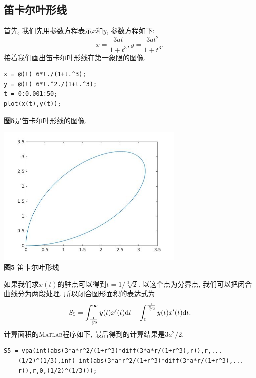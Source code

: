\documentclass[a4paper,12pt]{article}
\begin{document}
\begin{CJK*}{UTF8}{gbsn}
\section{笛卡尔叶形线}
首先, 我们先用参数方程表示$x$和$y$, 参数方程如下:
\begin{equation*}
x=\frac{3at}{1+t^3}, y=\frac{3at^2}{1+t^3}.
\end{equation*}
接着我们画出笛卡尔叶形线在第一象限的图像.\vspace{-15pt}
\begin{lstlisting}
x = @(t) 6*t./(1+t.^3);
y = @(t) 6*t.^2./(1+t.^3);
t = 0:0.001:50;
plot(x(t),y(t));
\end{lstlisting}\par\vspace{10pt}
\textbf{图5}是笛卡尔叶形线的图像.\vspace{-5pt}
\begin{center}
\includegraphics[width = 9cm]{descartes_folium.jpg}\\
\vspace{-10pt}\textbf{图5} 笛卡尔叶形线\\
\end{center}\vspace{5pt}
如果我们求$x(t)$的驻点可以得到$t=1/\sqrt[3]{2}$. 以这个点为分界点, 我们可以把闭合曲线分为两段处理. 所以闭合图形面积的表达式为
\begin{equation*}
S_5=\int_{\frac{1}{\sqrt[3]{2}}}^{\infty}y(t)x'(t){\rm d}t - \int_{0}^{\frac{1}{\sqrt[3]{2}}}y(t)x'(t){\rm d}t.
\end{equation*}
计算面积的\textsc{Matlab}程序如下, 最后得到的计算结果是$3a^2/2$.\vspace{-15pt}
\begin{lstlisting}
S5 = vpa(int(abs(3*a*r^2/(1+r^3)*diff(3*a*r/(1+r^3),r)),r,...
    (1/2)^(1/3),inf)-int(abs(3*a*r^2/(1+r^3)*diff(3*a*r/(1+r^3),...
    r)),r,0,(1/2)^(1/3)));
\end{lstlisting}\par




\end{CJK*}
\end{document}
